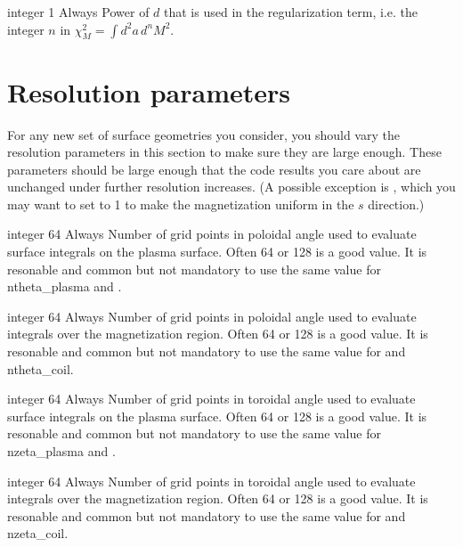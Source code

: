 \myhrule

{integer}
{1}
{Always}
{Power of $d$ that is used in the regularization term, i.e. the integer $n$ in $\chi^2_M = \int d^2a \, d^n M^2$.}

\myhrule

\section{Resolution parameters}

For any new set of surface geometries you consider, you should vary the resolution parameters in this section to make sure
they are large enough.  These parameters should be large enough that the code results you care about are unchanged under further
resolution increases. (A possible exception is , which you may want to set to 1 to make the magnetization
uniform in the $s$ direction.)

\myhrule

{integer}
{64}
{Always}
{Number of grid points in poloidal angle used to evaluate surface integrals on the plasma surface.
Often 64 or 128 is a good value.
It is resonable and common but not mandatory to use the same value for {\ttfamily ntheta\_plasma} and .}

\myhrule

{integer}
{64}
{Always}
{Number of grid points in poloidal angle used to evaluate integrals over the magnetization region.
Often 64 or 128 is a good value.
It is resonable and common but not mandatory to use the same value for  and {\ttfamily ntheta\_coil}.}

\myhrule


{integer}
{64}
{Always}
{Number of grid points in toroidal angle used to evaluate surface integrals on the plasma surface.
Often 64 or 128 is a good value.
It is resonable and common but not mandatory to use the same value for {\ttfamily nzeta\_plasma} and .}

\myhrule

{integer}
{64}
{Always}
{Number of grid points in toroidal angle used to evaluate integrals over the magnetization region.
Often 64 or 128 is a good value.
It is resonable and common but not mandatory to use the same value for  and {\ttfamily nzeta\_coil}.}

\myhrule

